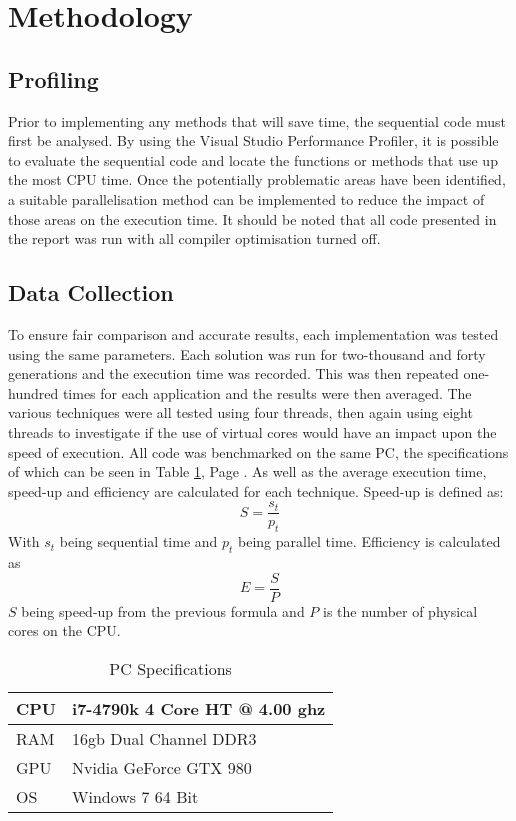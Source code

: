 \documentclass[journal,transmag]{IEEEtran}
\begin{document}
\section{Methodology}
	
	
	\subsection{Profiling}
		Prior to implementing any methods that will save time, the sequential code must first be analysed. By using the Visual Studio Performance Profiler, it is possible to evaluate the sequential code and locate the functions or methods that use up the most CPU time. Once the potentially problematic areas have been identified, a suitable parallelisation method can be implemented to reduce the impact of those areas on the execution time. It should be noted that all code presented in the report was run with all compiler optimisation turned off. 	
		
	\subsection{Data Collection}
		To ensure fair comparison and accurate results, each implementation was tested using the same parameters. Each solution was run for two-thousand and forty generations and the execution time was recorded. This was then repeated one-hundred times for each application and the results were then averaged. The various techniques were all tested using four threads, then again using eight threads to investigate if the use of virtual cores would have an impact upon the speed of execution. All code was benchmarked on the same PC, the specifications of which can be seen in Table \ref{pcSpecsTabel}, Page \pageref{pcSpecsTabel}. As well as the average execution time, speed-up and efficiency are calculated for each technique. Speed-up is defined as: 
		\[S=\frac{s_{t}}{p_{t}}\]
		With \(s_{t}\) being sequential time and \(p_{t}\) being parallel time.
		Efficiency is calculated as 
		\[E = \frac{S}{P}\]
		\(S\) being speed-up from the previous formula and \(P\) is the number of physical cores on the CPU.
		\begin{table}[]
			\centering
			\caption{PC Specifications}
			\label{pcSpecsTabel}
			\begin{tabular}{|l|l|}
				\hline
				CPU & i7-4790k 4 Core HT @ 4.00 ghz \\ \hline
				RAM & 16gb Dual Channel DDR3        \\ \hline
				GPU & Nvidia GeForce GTX 980        \\ \hline
				OS  & Windows 7 64 Bit              \\ \hline
			\end{tabular}
		\end{table}
		
\end{document}
